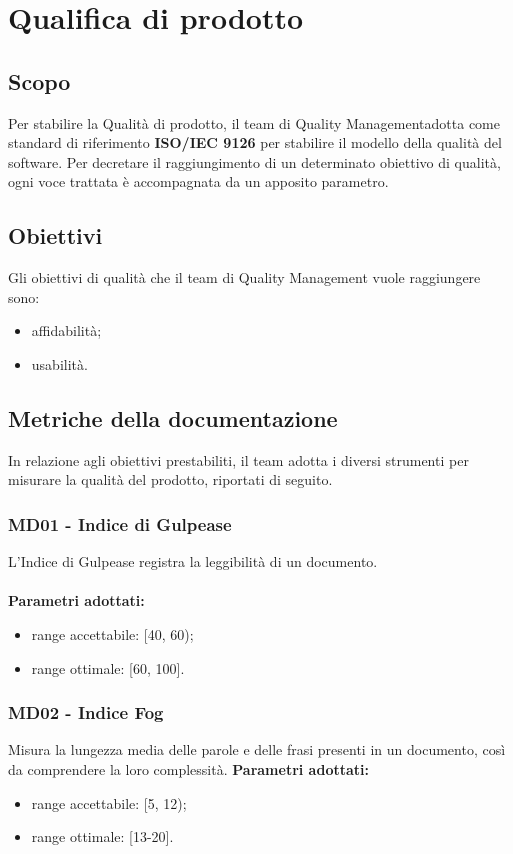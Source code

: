 \section{Qualifica di prodotto}
\subsection{Scopo}
Per stabilire la Qualità di prodotto, il team di Quality Management\glo adotta come standard di riferimento \textbf{ISO/IEC 9126} per stabilire il modello della qualità del software. Per decretare il raggiungimento di un determinato obiettivo di qualità, ogni voce trattata è accompagnata da un apposito parametro.
\subsection{Obiettivi}
Gli obiettivi di qualità che il team di Quality Management vuole raggiungere sono:
\begin{itemize}
\item affidabilità;
\item usabilità.
\end{itemize}
\subsection{Metriche della documentazione}
In relazione agli obiettivi prestabiliti, il team adotta i diversi strumenti per misurare la qualità del prodotto, riportati di seguito.
\subsubsection{MD01 - Indice di Gulpease}
L'Indice di Gulpease registra la leggibilità di un documento. \\ \\ 
\textbf{Parametri adottati:} 
\begin{itemize}
\item range accettabile: [40, 60);
\item range ottimale: [60, 100].
\end{itemize}

\subsubsection{MD02 - Indice Fog}
Misura la lungezza media delle parole e delle frasi presenti in un documento, così da comprendere la loro complessità.
\textbf{Parametri adottati:} 
\begin{itemize}
\item range accettabile: [5, 12);
\item range ottimale: [13-20].
\end{itemize}

